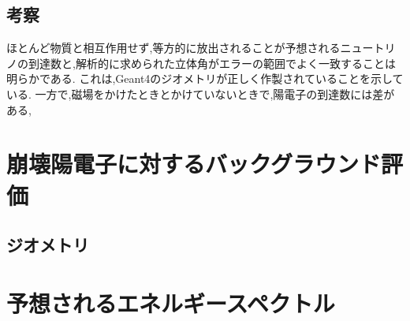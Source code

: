 \subsection{考察}

ほとんど物質と相互作用せず,等方的に放出されることが予想されるニュートリノの到達数と,解析的に求められた立体角がエラーの範囲でよく一致することは明らかである.
これは,Geant4のジオメトリが正しく作製されていることを示している.
一方で,磁場をかけたときとかけていないときで,陽電子の到達数には差がある,


\section{崩壊陽電子に対するバックグラウンド評価}

\subsection{ジオメトリ}

\section{予想されるエネルギースペクトル}

